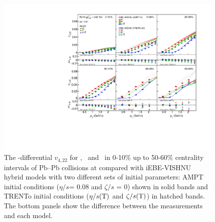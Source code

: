  \begin{figure}[h]
\begin{center}
\includegraphics[scale=0.73]{figures/model/TrentoAndAMPT_v422_gap00_PID2.pdf}
\end{center}
\caption{The \pT-differential $v_{4,22}$ for \pion, \kaon~and \proton~in 0-10\% up to 50-60\% centrality intervals of Pb--Pb collisions at \sNN compared with iEBE-VISHNU hybrid models with two different sets of initial parameters: AMPT initial conditions ($\eta/s$= 0.08 and $\zeta/s$ = 0) shown in solid bands and TRENTo initial conditions ($\eta/s({\rm T})$ and $\zeta/s({\rm T})$) in hatched bands. The bottom panels show the difference between the measurements and each model.}
\label{v422_model}
\end{figure}

